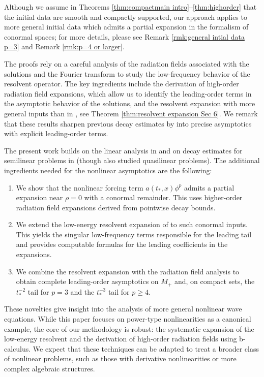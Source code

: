 \documentclass[10pt,a4paper,reqno]{amsart}
\theoremstyle{definition}
\theoremstyle{remark}
\numberwithin{equation}{section}
\begin{document}
Although we assume in Theorems \ref{thm:compactmain intro}--\ref{thm:highorder} that the initial data are smooth and compactly supported, our approach applies to more general initial data which admits a partial expansion in the formalism of conormal spaces; for more details, please see Remark \ref{rmk:general intial data p=3} and Remark \ref{rmk:p=4 or larger}. 

The proofs rely on a careful analysis of the radiation fields associated with the solutions and the Fourier transform to study the low-frequency behavior of the resolvent operator. The key ingredients include the derivation of high-order radiation field expansions, which allow us to identify the leading-order terms in the asymptotic behavior of the solutions, and the resolvent expansion with more general inputs than in \cite[Theorem 3.1]{Hin22}, see Theorem \ref{thm:resolvent expansion Sec 6}. We remark that these results sharpen previous decay estimates by \cite{Looi22,Looi22.2,Toh2022} into precise asymptotics with explicit leading-order terms. 

The present work builds on the linear analysis in \cite{Hin22} and on decay estimates for semilinear problems in \cite{Looi22,Looi22.2,Toh2022} (though \cite{Looi22.2} also studied quasilinear problems). The additional ingredients needed for the nonlinear asymptotics are the following:
\begin{enumerate}
\item We show that the nonlinear forcing term $a(t_*,x)\phi^p$ admits a partial expansion near $\rho=0$ with a conormal remainder. This uses higher-order radiation field expansions derived from pointwise decay bounds.
\item We extend the low-energy resolvent expansion of \cite{Hin22} to such conormal inputs. This yields the singular low-frequency terms responsible for the leading tail and provides computable formulas for the leading coefficients in the expansions.
\item We combine the resolvent expansion with the radiation field analysis to obtain complete leading-order asymptotics on $M_+$ and, on compact sets, the $t_*^{-2}$ tail for $p=3$ and the $t_*^{-3}$ tail for $p\ge 4$.
\end{enumerate}

  These novelties %
give insight into the analysis of more general nonlinear wave equations. While this paper focuses on power-type nonlinearities as a canonical example, the core of our methodology is robust: the systematic expansion of the low-energy resolvent and the derivation of high-order radiation fields using b-calculus. We expect that these techniques can be adapted to treat a broader class of nonlinear problems, such as those with derivative nonlinearities or more complex algebraic structures.
\end{document}
